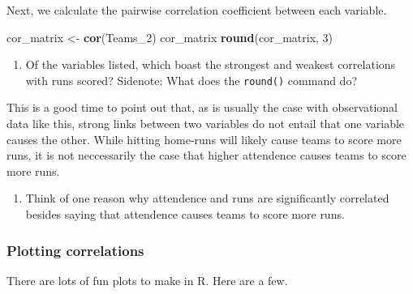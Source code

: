 \documentclass[]{article}
\newenvironment{Shaded}{\begin{snugshade}}{\end{snugshade}}
\newcommand{\DecValTok}[1]{\textcolor[rgb]{0.00,0.00,0.81}{#1}}
\newcommand{\KeywordTok}[1]{\textcolor[rgb]{0.13,0.29,0.53}{\textbf{#1}}}
\newcommand{\NormalTok}[1]{#1}
\newcommand{\OperatorTok}[1]{\textcolor[rgb]{0.81,0.36,0.00}{\textbf{#1}}}
\newcommand{\StringTok}[1]{\textcolor[rgb]{0.31,0.60,0.02}{#1}}
\providecommand{\tightlist}{%
  \setlength{\itemsep}{0pt}\setlength{\parskip}{0pt}}
\begin{document}
\begin{Shaded}
\end{Shaded}

Next, we calculate the pairwise correlation coefficient between each
variable.

\begin{Shaded}
\begin{Highlighting}[]
\NormalTok{cor_matrix <-}\StringTok{ }\KeywordTok{cor}\NormalTok{(Teams_}\DecValTok{2}\NormalTok{)}
\NormalTok{cor_matrix}
\KeywordTok{round}\NormalTok{(cor_matrix, }\DecValTok{3}\NormalTok{)}
\end{Highlighting}
\end{Shaded}

\begin{enumerate}
\def\labelenumi{\arabic{enumi}.}
\setcounter{enumi}{10}
\tightlist
\item
  Of the variables listed, which boast the strongest and weakest
  correlations with runs scored? Sidenote: What does the
  \texttt{round()} command do?
\end{enumerate}

This is a good time to point out that, as is usually the case with
observational data like this, strong links between two variables do not
entail that one variable causes the other. While hitting home-runs will
likely cause teams to score more runs, it is not neccessarily the case
that higher attendence causes teams to score more runs.

\begin{enumerate}
\def\labelenumi{\arabic{enumi}.}
\setcounter{enumi}{11}
\tightlist
\item
  Think of one reason why attendence and runs are significantly
  correlated besides saying that attendence causes teams to score more
  runs.
\end{enumerate}

\hypertarget{plotting-correlations}{%
\subsubsection{Plotting correlations}\label{plotting-correlations}}

There are lots of fun plots to make in R. Here are a few.
\end{document}
